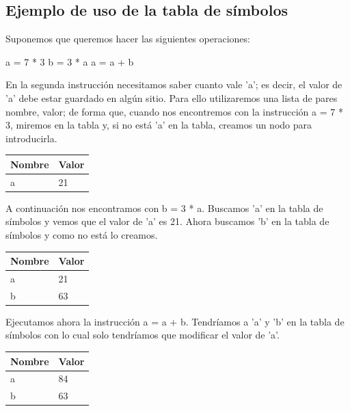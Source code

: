 \documentclass[11pt, english]{article}
\begin{document}
	\subsection{Ejemplo de uso de la tabla de símbolos}
	
	Suponemos que queremos hacer las siguientes operaciones:
	
		a = 7 * 3
		b = 3 * a
		a = a + b
	
	En la segunda instrucción necesitamos saber cuanto vale 'a'; es decir, el valor de 'a' debe estar guardado en algún sitio. Para ello utilizaremos una lista de pares nombre, valor; de forma que, cuando nos encontremos con la instrucción a = 7 * 3, miremos en la tabla y, si no está 'a' en la tabla, creamos un nodo para introducirla.
	\newline
	\begin{table}[H]
		\begin{center}
			\begin{tabular}{l|l}
				\toprule
				\textbf{Nombre} & \textbf{Valor}\\
				\midrule
				a	& 	21\\
				\bottomrule
			\end{tabular}
		\end{center}
	\end{table}
	A continuación nos encontramos con b = 3 * a. Buscamos 'a' en la tabla de símbolos y vemos que el valor de 'a' es 21. Ahora buscamos 'b' en la tabla de símbolos y como no está lo creamos.
	\newline
	\begin{table}[H]
		\begin{center}
			\begin{tabular}{l|l}
				\toprule
				\textbf{Nombre} & \textbf{Valor}\\
				\midrule
				a	& 	21\\
				b	&	63\\
				\bottomrule
			\end{tabular}
		\end{center}
	\end{table}
	Ejecutamos ahora la instrucción a = a + b. Tendríamos a 'a' y 'b' en la tabla de símbolos con lo cual solo tendríamos que modificar	el valor de 'a'.
	\newline
	\begin{table}[H]
		\begin{center}
			\begin{tabular}{l|l}
				\toprule
				\textbf{Nombre} & \textbf{Valor}\\
				\midrule
				a	& 	84\\
				b	&	63\\
				\bottomrule
			\end{tabular}
		\end{center}
	\end{table}
	
\end{document}
